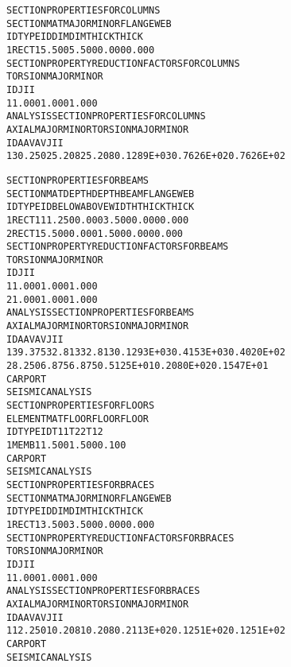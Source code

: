 \documentclass[12pt,notitle,letterpaper]{report}
\renewenvironment{quote}
  {\small\list{}{\rightmargin=0cm \leftmargin=0cm}%
   \item\relax}
  {\endlist}
\begin{document}
\begin{quote}
\begin{alltt}
SECTION PROPERTIES FOR COLUMNS
      SECTION            MAT     MAJOR     MINOR    FLANGE       WEB
   ID  TYPE                ID       DIM       DIM     THICK     THICK
   1  RECT                 1     5.500     5.500     0.000     0.000
SECTION PROPERTY REDUCTION FACTORS FOR  COLUMNS
            TORSION       MAJOR       MINOR
   ID             J           I           I
   1         1.000       1.000       1.000
ANALYSIS SECTION PROPERTIES FOR   COLUMNS
            AXIAL       MAJOR       MINOR     TORSION       MAJOR       MINOR
   ID             A          AV          AV           J           I           I
   1        30.250      25.208      25.208  0.1289E+03  0.7626E+02  0.7626E+02

SECTION PROPERTIES FOR BEAMS
      SECTION            MAT     DEPTH     DEPTH      BEAM    FLANGE       WEB
   ID  TYPE                ID     BELOW     ABOVE     WIDTH     THICK     THICK
   1  RECT                 1    11.250     0.000     3.500     0.000     0.000
   2  RECT                 1     5.500     0.000     1.500     0.000     0.000
SECTION PROPERTY REDUCTION FACTORS FOR  BEAMS
            TORSION       MAJOR       MINOR
   ID             J           I           I
   1         1.000       1.000       1.000
   2         1.000       1.000       1.000
ANALYSIS SECTION PROPERTIES FOR   BEAMS
            AXIAL       MAJOR       MINOR     TORSION       MAJOR       MINOR
   ID             A          AV          AV           J           I           I
   1        39.375      32.813      32.813  0.1293E+03  0.4153E+03  0.4020E+02
   2         8.250       6.875       6.875  0.5125E+01  0.2080E+02  0.1547E+01
CARPORT
SEISMIC ANALYSIS
SECTION PROPERTIES FOR   FLOORS
      ELEMENT   MAT    FLOOR    FLOOR    FLOOR
   ID TYPE       ID      T11      T22      T12
   1 MEMB        1    1.500    1.500    0.100
CARPORT
SEISMIC ANALYSIS
SECTION PROPERTIES FOR BRACES
      SECTION            MAT     MAJOR     MINOR    FLANGE       WEB
   ID  TYPE                ID       DIM       DIM     THICK     THICK
   1  RECT                 1     3.500     3.500     0.000     0.000
SECTION PROPERTY REDUCTION FACTORS FOR  BRACES
            TORSION       MAJOR       MINOR
   ID             J           I           I
   1         1.000       1.000       1.000
ANALYSIS SECTION PROPERTIES FOR   BRACES
            AXIAL       MAJOR       MINOR     TORSION       MAJOR       MINOR
   ID             A          AV          AV           J           I           I
   1        12.250      10.208      10.208  0.2113E+02  0.1251E+02  0.1251E+02
CARPORT
SEISMIC ANALYSIS

\end{alltt}
\end{quote}
\end{document}

